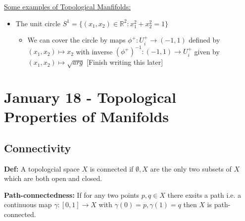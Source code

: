 \documentclass{article}
\begin{document}
\vskip 0.5cm
\underline{Some examples of Topological Manfifolds:}
\begin{itemize}
  \item The unit circle $S^1 = \{ (x_1, x_2) \in \mathbb{R}^2 : x_1^2 + x_2^2 = 1 \}$  
  \begin{itemize}
    \item We can cover the circle by maps $\phi^+ : U_i^+ \rightarrow (-1, 1)$ defined by $(x_1, x_2) \mapsto x_2$ with inverse $(\phi^+)^{-1} : (-1, 1) \rightarrow U_i^+$ given by $(x_1, x_2) \mapsto \sqrt{arg}$ [Finish writing this later]
  \end{itemize}
\end{itemize}

\pagebreak

\section{January 18 - Topological Properties of Manifolds}
\vskip 0.5cm

\subsection*{Connectivity}
\vskip 0.5cm

\textbf{Def:} A topologcial space $X$ is connected if $\emptyset, X$ are the only two subsets of $X$ which are both open and closed.

\vskip 0.5cm
\textbf{Path-connectedness:} If for any two points $p, q \in X$ there exsits a path i.e. a continuous map $\gamma : [0, 1] \rightarrow X$ with $\gamma(0) = p, \gamma(1) = q$ then $X$ is path-connected.

\end{document}

